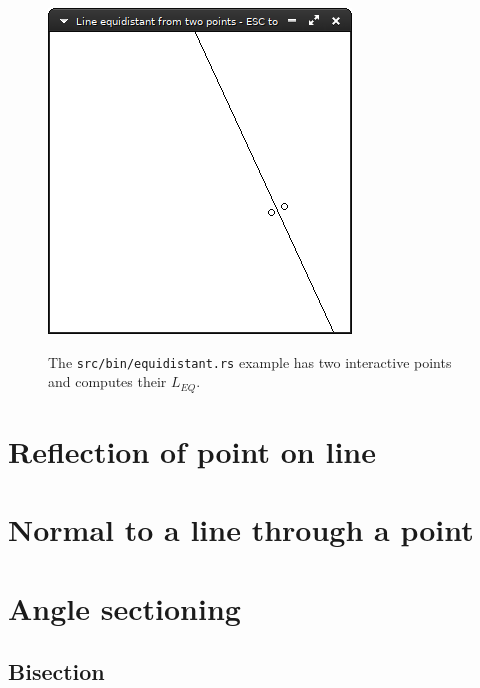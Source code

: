 \documentclass[12pt,openany,a4,usenames,dvipsnames]{book}
\DeclareRobustCommand{\Caption}[1]{\par%
  \vspace{1em}
  {\noindent{}#1}}
\begin{document}
\begin{figure}[H]
\begin{minipage}{0.49\textwidth}
    \includegraphics[width=\textwidth,keepaspectratio]{figures/equidistant2.png}
  \end{minipage}
  \Caption{The \texttt{src/bin/equidistant.rs} example has two interactive points and computes their $L_{EQ}$.}
\end{figure}
%
%
%
%
%
\chapter{Reflection of point on line}
\skelpar%
%
%
%
\chapter{Normal to a line through a point}
\skelpar%
\chapter{Angle sectioning}
\section{Bisection}
\skelpar%
\end{document}

